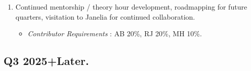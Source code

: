 \documentclass[
  letterpaper,
  DIV=11,
  numbers=noendperiod]{scrartcl}
\providecommand{\tightlist}{%
  \setlength{\itemsep}{0pt}\setlength{\parskip}{0pt}}\usepackage{longtable,booktabs,array}
\begin{document}
\begin{enumerate}
  \begin{itemize}
  \tightlist
  \item
    \emph{Deliverables} : Ability to apply SMCNN easily to any GenJAX
    model.
  \item
    \emph{Contributor Requirements} : AB 20\%, MH 20\%, MB 5\%
  \end{itemize}
\item
  Continued mentorship / theory hour development, roadmapping for future
  quarters, visitation to Janelia for continued collaboration.

  \begin{itemize}
  \tightlist
  \item
    \emph{Contributor Requirements} : AB 20\%, RJ 20\%, MH 10\%.
  \end{itemize}
\end{enumerate}

\subsection{Q3 2025+Later.}\label{q3-2025later.}
\end{document}

